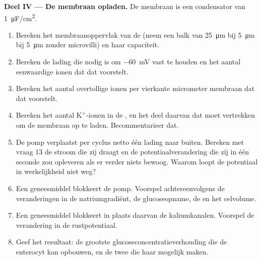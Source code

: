 \begin{problem}
\medskip
\noindent\textbf{Deel IV --- De membraan opladen.}
De membraan is een condensator van \qty{1}{\micro F/cm^2}.
\begin{enumerate}[resume]
  \item Bereken het membraanoppervlak van de  (neem een balk van
        \qty{25}{\micro m} bij \qty{5}{\micro m} bij \qty{5}{\micro m}
        zonder microvilli) en haar capaciteit.
  \item Bereken de lading die nodig is om \qty{-60}{mV} vast te houden en
        het aantal eenwaardige ionen dat dat voorstelt.
  \item Bereken het aantal overtollige ionen per vierkante micrometer
        membraan dat dat voorstelt.
  \item Bereken het aantal $\mathrm{K^+}$-ionen in de , en het deel
        daarvan dat moet vertrekken om de membraan op te laden.
        Becommentarieer dat.
  \item De pomp verplaatst per cyclus netto één lading naar buiten. Bereken
        met vraag 13 de stroom die zij draagt en de potentiaalverandering
        die zij in één seconde zou opleveren als er verder niets bewoog.
        Waarom loopt de potentiaal in werkelijkheid niet weg?
  \item Een geneesmiddel blokkeert de pomp. Voorspel achtereenvolgens de
        veranderingen in de natriumgradiënt, de glucoseopname, de
         en het celvolume.
  \item Een geneesmiddel blokkeert in plaats daarvan de kaliumkanalen.
        Voorspel de verandering in de rustpotentiaal.
  \item Geef het resultaat: de grootste glucoseconcentratieverhouding die
        de enterocyt kan opbouwen, en de twee  die haar
        mogelijk maken.
\end{enumerate}
\end{problem}
